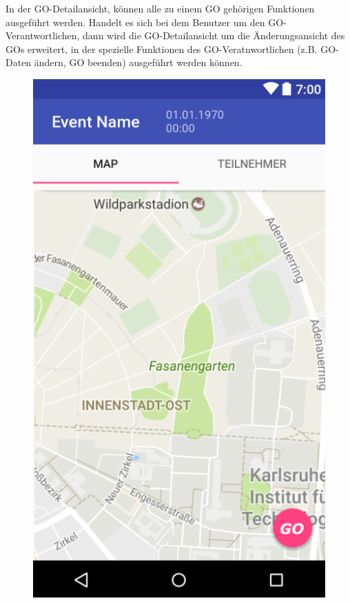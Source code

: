 \documentclass[parskip=full]{scrartcl}
\begin{document}
In der GO-Detailansicht, können alle zu einem GO gehörigen Funktionen ausgeführt werden. Handelt es sich bei dem Benutzer um den GO-Verantwortlichen, dann wird die GO-Detailansicht um die Änderungsansicht des GOs erweitert, in der spezielle Funktionen des GO-Veratnwortlichen (z.B. GO-Daten ändern, GO beenden) ausgeführt werden können.

\begin{figure}[H]
  \vspace{1cm}
  \centering
  \begin{minipage}[b]{0.4\textwidth}
    \includegraphics[width=\textwidth]{GUI/AndroidStudio/event_info_navi.PNG}

\end{minipage}
\end{figure}
\end{document}
